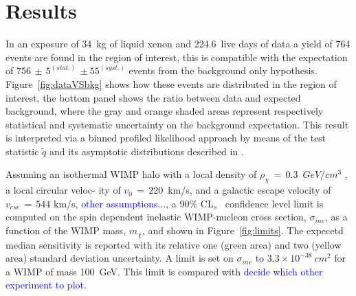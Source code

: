 \section{Results}
In an exposure of 34~kg of liquid xenon and 224.6~live days of data a yield of 764 events are found in the region of interest,
this is compatible with the expectation of $756 \, \pm \, 5^{(stat.)} \, \pm 55^{(syst.)}$ events from the background only hypothesis. 
Figure~\ref{fig:dataVSbkg} shows how these events are distributed in the region of interest, the bottom panel shows the ratio
between data and expected background, where the gray and orange shaded areas represent respectively statistical and systematic uncertainty 
on the background expectation.
This result is interpreted via a binned profiled likelihood approach by means of the test statistic $\tilde{q}$
and its asymptotic distributions described in \cite{asympt}. 

Assuming  an isothermal WIMP halo with a local density of $\rho_{\chi} \, = \, 0.3$~$GeV/cm^3$ , a local circular veloc-
ity of $v_0 \,= \, 220$~km/s, and a galactic escape velocity of $v_{esc} \, = \, 544$ km/s, 
\textcolor{blue}{other assumptions...,} a 90\% CL$_s$~\cite{cls} confidence level limit is  
computed on the spin dependent inelastic WIMP-nucleon cross section, $\sigma_{ine}$, as a function of the WIMP mass, $m_{\chi}$, and shown in Figure~\ref{fig:limits}.
The expecetd median sensitivity is reported with its relative one (green area) and two (yellow area) standard deviation uncertainty.
A limit is set on $\sigma_{ine}$ to $3.3 \times 10^{-38} ~cm^{2}$ for a WIMP of mass 100~GeV. This limit is compared with
\textcolor{blue}{decide which other experiment to plot.}

